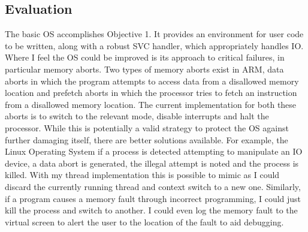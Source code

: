 \subsection{Evaluation}
The basic OS accomplishes Objective 1. It provides an environment for user code to be written, along with a robust SVC handler, which appropriately handles IO. Where I feel the OS could be improved is its approach to critical failures, in particular memory aborts. Two types of memory aborts exist in ARM, data aborts in which the program attempts to access data from a disallowed memory location and prefetch aborts in which the processor tries to fetch an instruction from a disallowed memory location. The current implementation for both these aborts is to switch to the relevant mode, disable interrupts and halt the processor. While this is potentially a valid strategy to protect the OS against further damaging itself, there are better solutions available. For example, the Linux Operating System if a process is detected attempting to manipulate an IO device, a data abort is generated, the illegal attempt is noted and the process is killed. With my thread implementation this is possible to mimic as I could discard the currently running thread and context switch to a new one. Similarly, if a program causes a memory fault through incorrect programming, I could just kill the process and switch to another. I could even log the memory fault to the virtual screen to alert the user to the location of the fault to aid debugging.














